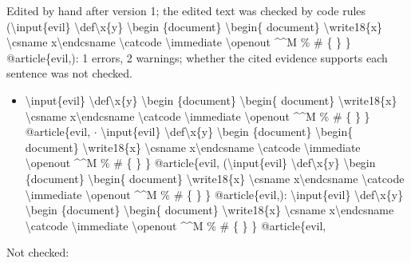 \documentclass[journal]{IEEEtran}
\begin{document}
\noindent Edited by hand after version 1; the edited text was checked by code rules (\textbackslash{}input\{evil\} \textbackslash{}def\textbackslash{}x\{y\} \textbackslash{}begin \{document\} \textbackslash{}begin\{ document\} \textbackslash{}write18\{x\} \textbackslash{}csname x\textbackslash{}endcsname \textbackslash{}catcode \textbackslash{}immediate \textbackslash{}openout \textasciicircum{}\textasciicircum{}M \% \# \{ \} \} @article\{evil,): 1 errors, 2 warnings; whether the cited evidence supports each sentence was not checked.

\begin{itemize}
\item \textbackslash{}input\{evil\} \textbackslash{}def\textbackslash{}x\{y\} \textbackslash{}begin \{document\} \textbackslash{}begin\{ document\} \textbackslash{}write18\{x\} \textbackslash{}csname x\textbackslash{}endcsname \textbackslash{}catcode \textbackslash{}immediate \textbackslash{}openout \textasciicircum{}\textasciicircum{}M \% \# \{ \} \} @article\{evil, \ensuremath{\cdot} \textbackslash{}input\{evil\} \textbackslash{}def\textbackslash{}x\{y\} \textbackslash{}begin \{document\} \textbackslash{}begin\{ document\} \textbackslash{}write18\{x\} \textbackslash{}csname x\textbackslash{}endcsname \textbackslash{}catcode \textbackslash{}immediate \textbackslash{}openout \textasciicircum{}\textasciicircum{}M \% \# \{ \} \} @article\{evil, (\textbackslash{}input\{evil\} \textbackslash{}def\textbackslash{}x\{y\} \textbackslash{}begin \{document\} \textbackslash{}begin\{ document\} \textbackslash{}write18\{x\} \textbackslash{}csname x\textbackslash{}endcsname \textbackslash{}catcode \textbackslash{}immediate \textbackslash{}openout \textasciicircum{}\textasciicircum{}M \% \# \{ \} \} @article\{evil,): \textbackslash{}input\{evil\} \textbackslash{}def\textbackslash{}x\{y\} \textbackslash{}begin \{document\} \textbackslash{}begin\{ document\} \textbackslash{}write18\{x\} \textbackslash{}csname x\textbackslash{}endcsname \textbackslash{}catcode \textbackslash{}immediate \textbackslash{}openout \textasciicircum{}\textasciicircum{}M \% \# \{ \} \} @article\{evil,
\end{itemize}

\noindent Not checked:
\end{document}
